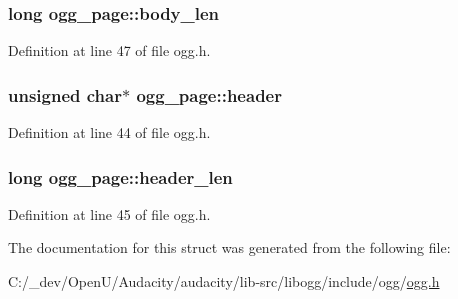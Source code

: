 \subsubsection[{\texorpdfstring{body\+\_\+len}{body_len}}]{\setlength{\rightskip}{0pt plus 5cm}long ogg\+\_\+page\+::body\+\_\+len}\hypertarget{structogg__page_ac6e649f0001899b512935448a903abac}{}\label{structogg__page_ac6e649f0001899b512935448a903abac}


Definition at line 47 of file ogg.\+h.

\subsubsection[{\texorpdfstring{header}{header}}]{\setlength{\rightskip}{0pt plus 5cm}unsigned char$\ast$ ogg\+\_\+page\+::header}\hypertarget{structogg__page_a9f251dc1a96fbfd84ff2585fbbc03c16}{}\label{structogg__page_a9f251dc1a96fbfd84ff2585fbbc03c16}


Definition at line 44 of file ogg.\+h.

\subsubsection[{\texorpdfstring{header\+\_\+len}{header_len}}]{\setlength{\rightskip}{0pt plus 5cm}long ogg\+\_\+page\+::header\+\_\+len}\hypertarget{structogg__page_aeaa6edc2ff9f2c5cc8f0ecf001936b7b}{}\label{structogg__page_aeaa6edc2ff9f2c5cc8f0ecf001936b7b}


Definition at line 45 of file ogg.\+h.



The documentation for this struct was generated from the following file\+:\begin{DoxyCompactItemize}
\item 
C\+:/\+\_\+dev/\+Open\+U/\+Audacity/audacity/lib-\/src/libogg/include/ogg/\hyperlink{ogg_8h}{ogg.\+h}\end{DoxyCompactItemize}
